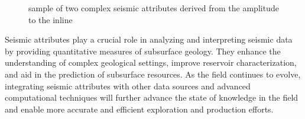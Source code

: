 \begin{figure}[htb!]
    \captionsetup[subfigure]{justification=centering}
    \centering

    

    \caption{sample of two complex seismic attributes derived from the amplitude to the inline}
    \label{fig:seismic-complex-attr}
\end{figure}

Seismic attributes play a crucial role in analyzing and interpreting seismic data by providing quantitative measures of subsurface geology.
They enhance the understanding of complex geological settings, improve reservoir characterization, and aid in the prediction of subsurface resources.
As the field continues to evolve, integrating seismic attributes with other data sources and advanced computational techniques will further advance the state of knowledge in the field and enable more accurate and efficient exploration and production efforts.
